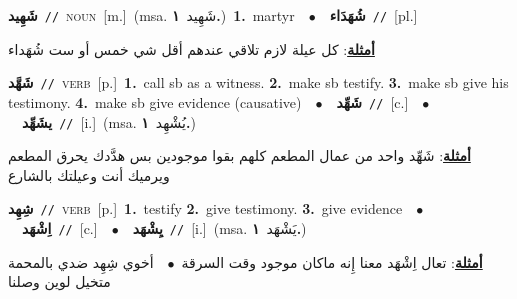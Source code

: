 \documentclass[10pt,a4paper,twoside]{article} %
\begin{document}
\begin{multicols}{2}
{\setlength\topsep{0pt}\textbf{\foreignlanguage{arabic}{شَهِيد}}\ {\color{gray}\texttt{//}\color{black}}\ \textsc{noun}\ [m.]\ \color{gray}(msa. \foreignlanguage{arabic}{شَهِيد}~\foreignlanguage{arabic}{\textbf{١.}})\color{black}\ \textbf{1.}~martyr\ \ $\bullet$\ \ \setlength\topsep{0pt}\textbf{\foreignlanguage{arabic}{شُهَدَاء}}\ {\color{gray}\texttt{//}\color{black}}\ [pl.]\  \begin{flushright}\color{gray}\foreignlanguage{arabic}{\textbf{\underline{\foreignlanguage{arabic}{أمثلة}}}: كل عيلة لازم تلاقي عندهم أقل شي خمس أو ست شُهَداء}\end{flushright}\color{black}} \vspace{2mm}

{\setlength\topsep{0pt}\textbf{\foreignlanguage{arabic}{شَهَّد}}\ {\color{gray}\texttt{//}\color{black}}\ \textsc{verb}\ [p.]\ \textbf{1.}~call sb as a witness.  \textbf{2.}~make sb testify.  \textbf{3.}~make sb give his testimony.  \textbf{4.}~make sb give evidence (causative)\ \ $\bullet$\ \ \setlength\topsep{0pt}\textbf{\foreignlanguage{arabic}{شَهِّد}}\ {\color{gray}\texttt{//}\color{black}}\ [c.]\ \ $\bullet$\ \ \setlength\topsep{0pt}\textbf{\foreignlanguage{arabic}{يشَهِّد}}\ {\color{gray}\texttt{//}\color{black}}\ [i.]\ \color{gray}(msa. \foreignlanguage{arabic}{يُشْهِد}~\foreignlanguage{arabic}{\textbf{١.}})\color{black}\  \begin{flushright}\color{gray}\foreignlanguage{arabic}{\textbf{\underline{\foreignlanguage{arabic}{أمثلة}}}: شَهِّد واحد من عمال المطعم كلهم بقوا موجودين بس هدَّدك يحرق المطعم ويرميك أنت وعيلتك بالشارع}\end{flushright}\color{black}} \vspace{2mm}

{\setlength\topsep{0pt}\textbf{\foreignlanguage{arabic}{شِهِد}}\ {\color{gray}\texttt{//}\color{black}}\ \textsc{verb}\ [p.]\ \textbf{1.}~testify  \textbf{2.}~give testimony.  \textbf{3.}~give evidence\ \ $\bullet$\ \ \setlength\topsep{0pt}\textbf{\foreignlanguage{arabic}{اِشْهَد}}\ {\color{gray}\texttt{//}\color{black}}\ [c.]\ \ $\bullet$\ \ \setlength\topsep{0pt}\textbf{\foreignlanguage{arabic}{يِشْهَد}}\ {\color{gray}\texttt{//}\color{black}}\ [i.]\ \color{gray}(msa. \foreignlanguage{arabic}{يَشْهَد}~\foreignlanguage{arabic}{\textbf{١.}})\color{black}\  \begin{flushright}\color{gray}\foreignlanguage{arabic}{\textbf{\underline{\foreignlanguage{arabic}{أمثلة}}}: تعال اِشْهَد معنا إِنه ماكان موجود وقت السرقة\ $\bullet$\ \  أخوي شِهِد ضدي بالمحمة متخيل لوين وصلنا}\end{flushright}\color{black}} \vspace{2mm}


\end{multicols}
\end{document}
